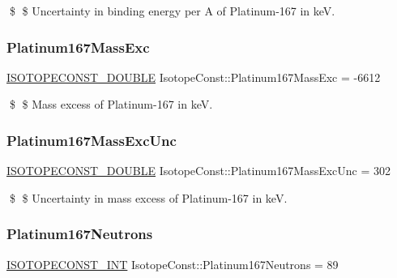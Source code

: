 \$ \$ Uncertainty in binding energy per A of Platinum-\/167 in keV. \mbox{\label{group___isotope_const-_platinum-_pt167_gada279351276755788a92c9d640aa7464}} 
\subsubsection{\texorpdfstring{Platinum167\+Mass\+Exc}{Platinum167MassExc}}
{\footnotesize\ttfamily \mbox{\hyperlink{group___isotope_const-_macros_ga8f45a7272ce02c0b4c65c44636ed719a}{I\+S\+O\+T\+O\+P\+E\+C\+O\+N\+S\+T\+\_\+\+D\+O\+U\+B\+LE}} Isotope\+Const\+::\+Platinum167\+Mass\+Exc = -\/6612}

\$ \$ Mass excess of Platinum-\/167 in keV. \mbox{\label{group___isotope_const-_platinum-_pt167_ga41be748115a702bcee3ce830fa3cc1a7}} 
\subsubsection{\texorpdfstring{Platinum167\+Mass\+Exc\+Unc}{Platinum167MassExcUnc}}
{\footnotesize\ttfamily \mbox{\hyperlink{group___isotope_const-_macros_ga8f45a7272ce02c0b4c65c44636ed719a}{I\+S\+O\+T\+O\+P\+E\+C\+O\+N\+S\+T\+\_\+\+D\+O\+U\+B\+LE}} Isotope\+Const\+::\+Platinum167\+Mass\+Exc\+Unc = 302}

\$ \$ Uncertainty in mass excess of Platinum-\/167 in keV. \mbox{\label{group___isotope_const-_platinum-_pt167_gaf57a3cdc9f27ce48eb2ef58334415c72}} 
\subsubsection{\texorpdfstring{Platinum167\+Neutrons}{Platinum167Neutrons}}
{\footnotesize\ttfamily \mbox{\hyperlink{group___isotope_const-_macros_ga5f18360b3e99483a35c32d789e62621c}{I\+S\+O\+T\+O\+P\+E\+C\+O\+N\+S\+T\+\_\+\+I\+NT}} Isotope\+Const\+::\+Platinum167\+Neutrons = 89}

